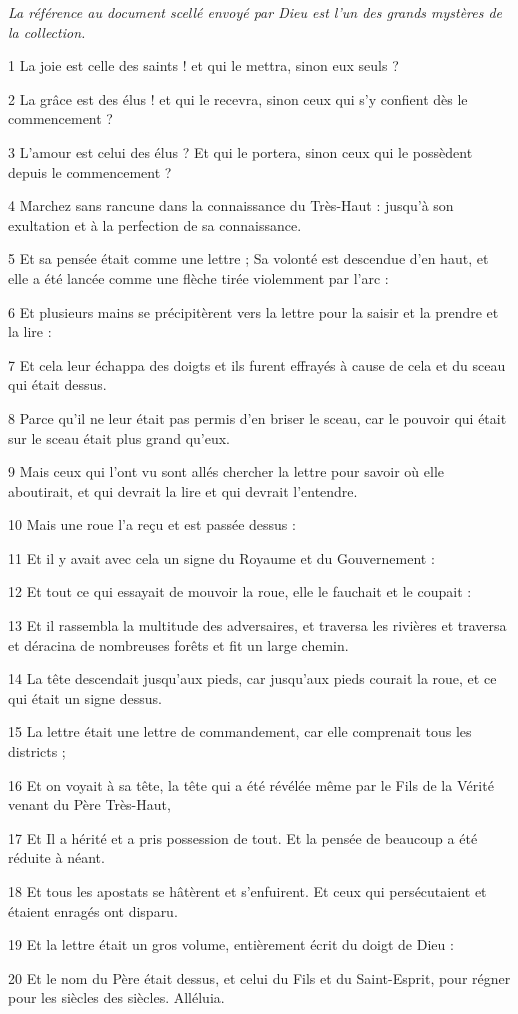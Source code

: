 
\par \textit{La référence au document scellé envoyé par Dieu est l'un des grands mystères de la collection.}

\par 1 La joie est celle des saints ! et qui le mettra, sinon eux seuls ?
\par 2 La grâce est des élus ! et qui le recevra, sinon ceux qui s’y confient dès le commencement ?
\par 3 L'amour est celui des élus ? Et qui le portera, sinon ceux qui le possèdent depuis le commencement ?
\par 4 Marchez sans rancune dans la connaissance du Très-Haut : jusqu'à son exultation et à la perfection de sa connaissance.
\par 5 Et sa pensée était comme une lettre ; Sa volonté est descendue d'en haut, et elle a été lancée comme une flèche tirée violemment par l'arc :
\par 6 Et plusieurs mains se précipitèrent vers la lettre pour la saisir et la prendre et la lire :
\par 7 Et cela leur échappa des doigts et ils furent effrayés à cause de cela et du sceau qui était dessus.
\par 8 Parce qu'il ne leur était pas permis d'en briser le sceau, car le pouvoir qui était sur le sceau était plus grand qu'eux.
\par 9 Mais ceux qui l'ont vu sont allés chercher la lettre pour savoir où elle aboutirait, et qui devrait la lire et qui devrait l'entendre.
\par 10 Mais une roue l'a reçu et est passée dessus :
\par 11 Et il y avait avec cela un signe du Royaume et du Gouvernement :
\par 12 Et tout ce qui essayait de mouvoir la roue, elle le fauchait et le coupait :
\par 13 Et il rassembla la multitude des adversaires, et traversa les rivières et traversa et déracina de nombreuses forêts et fit un large chemin.
\par 14 La tête descendait jusqu'aux pieds, car jusqu'aux pieds courait la roue, et ce qui était un signe dessus.
\par 15 La lettre était une lettre de commandement, car elle comprenait tous les districts ;
\par 16 Et on voyait à sa tête, la tête qui a été révélée même par le Fils de la Vérité venant du Père Très-Haut,
\par 17 Et Il a hérité et a pris possession de tout. Et la pensée de beaucoup a été réduite à néant.
\par 18 Et tous les apostats se hâtèrent et s'enfuirent. Et ceux qui persécutaient et étaient enragés ont disparu.
\par 19 Et la lettre était un gros volume, entièrement écrit du doigt de Dieu :
\par 20 Et le nom du Père était dessus, et celui du Fils et du Saint-Esprit, pour régner pour les siècles des siècles. Alléluia.

